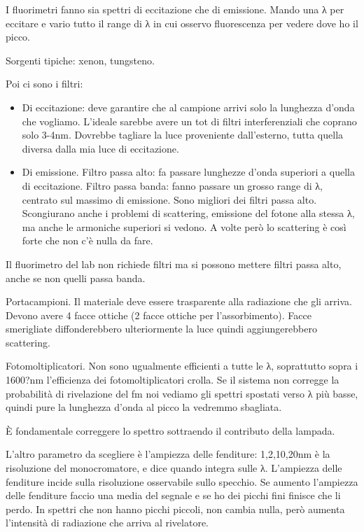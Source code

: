 I fluorimetri fanno sia spettri di eccitazione che di emissione. Mando
una λ per eccitare e vario tutto il range di λ in cui osservo
fluorescenza per vedere dove ho il picco.

Sorgenti tipiche: xenon, tungsteno.

Poi ci sono i filtri:

\begin{itemize}
\item
  Di eccitazione: deve garantire che al campione arrivi solo la
  lunghezza d'onda che vogliamo. L'ideale sarebbe avere un tot di filtri
  interferenziali che coprano solo 3-4nm. Dovrebbe tagliare la luce
  proveniente dall'esterno, tutta quella diversa dalla mia luce di
  eccitazione.
\item
  Di emissione. Filtro passa alto: fa passare lunghezze d'onda superiori
  a quella di eccitazione. Filtro passa banda: fanno passare un grosso
  range di λ, centrato sul massimo di emissione. Sono migliori dei
  filtri passa alto. Scongiurano anche i problemi di scattering,
  emissione del fotone alla stessa λ, ma anche le armoniche superiori si
  vedono. A volte però lo scattering è così forte che non c'è nulla da
  fare.
\end{itemize}

Il fluorimetro del lab non richiede filtri ma si possono mettere filtri
passa alto, anche se non quelli passa banda.

Portacampioni. Il materiale deve essere trasparente alla radiazione che
gli arriva. Devono avere 4 facce ottiche (2 facce ottiche per
l'assorbimento). Facce smerigliate diffonderebbero ulteriormente la luce
quindi aggiungerebbero scattering.

Fotomoltiplicatori. Non sono ugualmente efficienti a tutte le λ,
soprattutto sopra i 1600?nm l'efficienza dei fotomoltiplicatori crolla.
Se il sistema non corregge la probabilità di rivelazione del fm noi
vediamo gli spettri spostati verso λ più basse, quindi pure la lunghezza
d'onda al picco la vedremmo sbagliata.

È fondamentale correggere lo spettro sottraendo il contributo della
lampada.

L'altro parametro da scegliere è l'ampiezza delle fenditure: 1,2,10,20nm
è la risoluzione del monocromatore, e dice quando integra sulle λ.
L'ampiezza delle fenditure incide sulla risoluzione osservabile sullo
specchio. Se aumento l'ampiezza delle fenditure faccio una media del
segnale e se ho dei picchi fini finisce che li perdo. In spettri che non
hanno picchi piccoli, non cambia nulla, però aumenta l'intensità di
radiazione che arriva al rivelatore.

